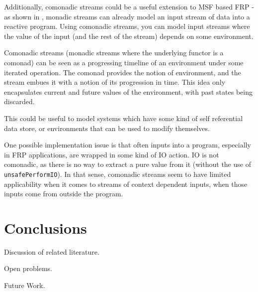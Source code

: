 \documentclass{article}
\begin{document}
Additionally, comonadic streams could be a useful extension to MSF based FRP - as shown in \cite{frp_refactored}, monadic streams can already model an input stream of data into a reactive program. Using comonadic streams, you can model input streams where the value of the input (and the rest of the stream) depends on some environment. 

Comonadic streams (monadic streams where the underlying functor is a comonad) can be seen as a progressing timeline of an environment under some iterated operation. The comonad provides the notion of environment, and the stream embues it with a notion of its progression in time. This idea only encapsulates current and future values of the environment, with past states being discarded.

This could be useful to model systems which have some kind of self referential data store, or environments that can be used to modify themselves. 

One possible implementation issue is that often inputs into a program, especially in FRP applications, are wrapped in some kind of IO action. IO is not comonadic, as there is no way to extract a pure value from it (without the use of \verb+unsafePerformIO+). In that sense, comonadic streams seem to have limited applicability when it comes to streams of context dependent inputs, when those inputs come from outside the program.

\section{Conclusions}

Discussion of related literature.

Open problems.

Future Work.


\end{document}
